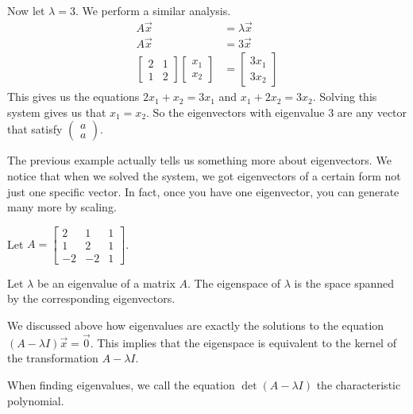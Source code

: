 \begin{example}
    Now let $\lambda=3$. We perform a similar analysis.
    \begin{align*}
        A\vec{x}&=\lambda\vec{x}\\
        A\vec{x}&=3\vec{x}\\
        \begin{bmatrix}
            2 & 1\\
            1 & 2
        \end{bmatrix}\begin{bmatrix}
            x_1 \\ x_2
        \end{bmatrix}&=\begin{bmatrix}
            3x_1 \\ 3x_2
        \end{bmatrix}
    \end{align*}
    This gives us the equations $2x_1+x_2=3x_1$ and $x_1+2x_2=3x_2$. Solving this system gives us that $x_1=x_2$. So the eigenvectors with eigenvalue $3$ are any vector that satisfy $\begin{pmatrix}
        a \\ a
    \end{pmatrix}$.
\end{example}
The previous example actually tells us something more about eigenvectors. We notice that when we solved the system, we got eigenvectors of a certain form not just one specific vector. In fact, once you have one eigenvector, you can generate many more by scaling.
\begin{example}
    Let $A=\begin{bmatrix}
        2 & 1 & 1\\
        1 & 2 & 1\\
        -2 & -2 & 1
    \end{bmatrix}$.
\end{example}
\begin{definition}
    Let $\lambda$ be an eigenvalue of a matrix $A$. The eigenspace of $\lambda$ is the space spanned by the corresponding eigenvectors.
\end{definition}
\begin{remark}
    We discussed above how eigenvalues are exactly the solutions to the equation $(A-\lambda I)\vec{x}=\vec{0}$. This implies that the eigenspace is equivalent to the kernel of the transformation $A-\lambda I$.
\end{remark}
\begin{definition}
    When finding eigenvalues, we call the equation $\det(A-\lambda I)$ the characteristic polynomial.
\end{definition}
